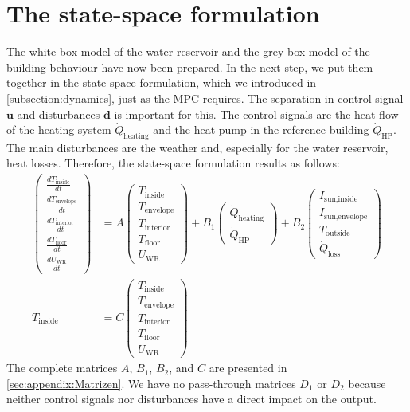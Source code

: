     \section{The state-space formulation}
    \label{holeModel}
    The white-box model of the water reservoir and the grey-box model of the building behaviour have now been prepared. In the next step, we put them together in the state-space formulation, which we introduced in \autoref{subsection:dynamics}, just as the MPC requires.\newline
    The separation in control signal $\textbf{u}$ and disturbances $\textbf{d}$ is important for this. The control signals are the heat flow of the heating system $\dot{Q}_\text{heating}$ and the heat pump in the reference building $\dot{Q}_\text{HP}$. The main disturbances are the weather and, especially for the water reservoir, heat losses. Therefore, the state-space formulation results as follows: 
  \begin{align}
	    \label{eq:ZRD Modell}
	 \left(\begin{array}{c} \frac{d T_\text{inside}}{d t} \\ \frac{d T_\text{envelope}}{d t} \\ \frac{d T_\text{interior}}{d t}\\ \frac{d T_\text{floor}}{d t}\\ \frac{d U_\text{WR}}{d t} \end{array}\right) &= A \left(\begin{array}{c} T_\text{inside} \\ T_\text{envelope} \\ T_\text{interior}\\ T_\text{floor}\\ U_\text{WR} \end{array}\right) + B_\text{1} \left(\begin{array}{c} \dot{Q}_\text{heating} \\ \dot{Q}_\text{HP} \end{array}\right) + B_\text{2} \left(\begin{array}{c} I_\text{sun,inside}\\ I_\text{sun,envelope}\\ T_\text{outside} \\ \dot{Q}_\text{loss} \end{array}\right) \\
	 T_\text{inside} &= C \left(\begin{array}{c} T_\text{inside} \\ T_\text{envelope} \\ T_\text{interior}\\ T_\text{floor}\\ U_\text{WR} \end{array}\right) \nonumber
	\end{align}	
    The complete matrices $A$, $B_\text{1}$, $B_\text{2}$, and $C$ are presented in \autoref{sec:appendix:Matrizen}. We have no pass-through matrices $D_\text{1}$ or $D_\text{2}$ because neither control signals nor disturbances have a direct impact on the output. 